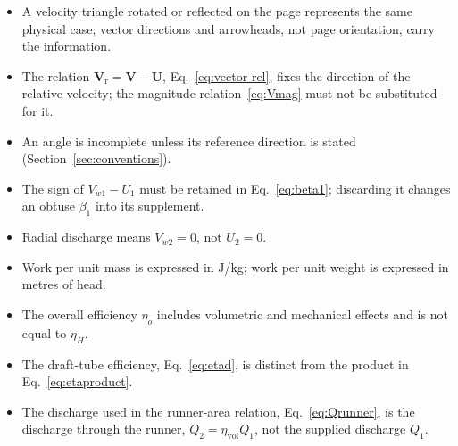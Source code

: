 \documentclass[11pt,a4paper]{article}
\numberwithin{equation}{section}
\newcommand{\vr}{\mathrm{r}}
\newcommand{\vvec}[1]{\bm{#1}}
\begin{document}
\begin{itemize}[nosep]
  \item A velocity triangle rotated or reflected on the page represents the same physical case; vector directions and arrowheads, not page orientation, carry the information.
  \item The relation $\vvec{V}_\vr = \vvec{V} - \vvec{U}$, Eq.~\eqref{eq:vector-rel}, fixes the direction of the relative velocity; the magnitude relation~\eqref{eq:Vmag} must not be substituted for it.
  \item An angle is incomplete unless its reference direction is stated (Section~\ref{sec:conventions}).
  \item The sign of $V_{w1}-U_1$ must be retained in Eq.~\eqref{eq:beta1}; discarding it changes an obtuse $\beta_1$ into its supplement.
  \item Radial discharge means $V_{w2}=0$, not $U_2=0$.
  \item Work per unit mass is expressed in \si{J/kg}; work per unit weight is expressed in metres of head.
  \item The overall efficiency $\eta_o$ includes volumetric and mechanical effects and is not equal to $\eta_H$.
  \item The draft-tube efficiency, Eq.~\eqref{eq:etad}, is distinct from the product in Eq.~\eqref{eq:etaproduct}.
  \item The discharge used in the runner-area relation, Eq.~\eqref{eq:Qrunner}, is the discharge through the runner, $Q_2 = \eta_{\mathrm{vol}}Q_1$, not the supplied discharge $Q_1$.
\end{itemize}
\end{document}
